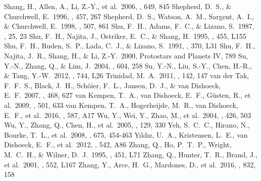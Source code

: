 \documentclass[twocolumn]{aastex61}
\begin{document}
\begin{thebibliography}{}
 Shang, H., Allen, A., Li, Z.-Y., et al.\ 2006, \apj, 649, 845 
 Shepherd, D.~S., \& Churchwell, E.\ 1996, \apj, 457, 267
 Shepherd, D.~S., Watson, A.~M., Sargent, A.~I., \& Churchwell, E.\ 1998, \apj, 507, 861 
 Shu, F.~H., Adams, F.~C., \& Lizano, S.\ 1987, \araa, 25, 23 
 Shu, F.~H., Najita, J., Ostriker, E.~C., \& Shang, H.\ 1995, \apjl, 455, L155 
 Shu, F.~H., Ruden, S.~P., Lada, C.~J., \& Lizano, S.\ 1991, \apjl, 370, L31
 Shu, F.~H., Najita, J.~R., Shang, H., \& Li, Z.-Y.\ 2000, Protostars and Planets IV, 789
 Su, Y.-N., Zhang, Q., \& Lim, J.\ 2004, \apj, 604, 258
 Su, Y.-N., Liu, S.-Y., Chen, H.-R., \& Tang, Y.-W.\ 2012, \apjl, 744, L26 
 Trinidad, M.~A.\ 2011, \aj, 142, 147 
 van der Tak, F.~F.~S., Black, J.~H., Sch{\"o}ier, F.~L., Jansen, D.~J., \& van Dishoeck, E.~F.\ 2007, \aap, 468, 627
 van Kempen, T.~A., van Dishoeck, E.~F., G{\"u}sten, R., et al.\ 2009, \aap, 501, 633 
 van Kempen, T.~A., Hogerheijde, M.~R., van Dishoeck, E.~F., et al.\ 2016, \aap, 587, A17
 Wu, Y., Wei, Y., Zhao, M., et al.\ 2004, \aap, 426, 503
 Wu, Y., Zhang, Q., Chen, H., et al.\ 2005, \aj, 129, 330 
 Yeh, S.~C.~C., Hirano, N., Bourke, T.~L., et al.\ 2008, \apj, 675, 454-463
 Y{\i}ld{\i}z, U.~A., Kristensen, L.~E., van Dishoeck, E.~F., et al.\ 2012, \aap, 542, A86
 Zhang, Q., Ho, P.~T.~P., Wright, M.~C.~H., \& Wilner, D.~J.\ 1995, \apjl, 451, L71 
 Zhang, Q., Hunter, T.~R., Brand, J., et al.\ 2001, \apjl, 552, L167 
 Zhang, Y., Arce, H.~G., Mardones, D., et al.\ 2016, \apj, 832, 158
\end{thebibliography}
\end{document}
